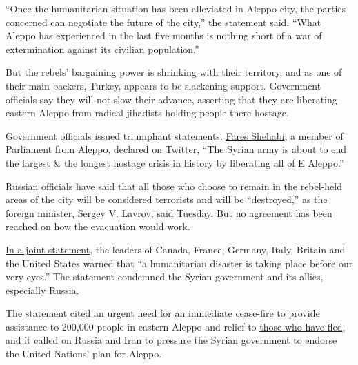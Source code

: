 ``Once the humanitarian situation has been alleviated in Aleppo city,
the parties concerned can negotiate the future of the city,'' the
statement said. ``What Aleppo has experienced in the last five months is
nothing short of a war of extermination against its civilian
population.''

But the rebels' bargaining power is shrinking with their territory, and
as one of their main backers, Turkey, appears to be slackening support.
Government officials say they will not slow their advance, asserting
that they are liberating eastern Aleppo from radical jihadists holding
people there hostage.

Government officials issued triumphant statements.
\href{https://twitter.com/ShehabiFares/status/806446029348503552}{Fares
Shehabi}, a member of Parliament from Aleppo, declared on Twitter, ``The
Syrian army is about to end the largest \& the longest hostage crisis in
history by liberating all of E Aleppo.''

Russian officials have said that all those who choose to remain in the
rebel-held areas of the city will be considered terrorists and will be
``destroyed,'' as the foreign minister, Sergey V. Lavrov,
\href{http://www.cbsnews.com/news/aleppo-fighting-continues-syrian-government-russia-warn-rebels-to-leave-city/}{said
Tuesday}. But no agreement has been reached on how the evacuation would
work.

\href{https://www.gov.uk/government/news/joint-statement-on-aleppo-7-december-2016}{In
a joint statement}, the leaders of Canada, France, Germany, Italy,
Britain and the United States warned that ``a humanitarian disaster is
taking place before our very eyes.'' The statement condemned the Syrian
government and its allies,
\href{http://www.nytimes3xbfgragh.onion/video/world/europe/100000004769407/russia-begins-new-offensive-in-aleppo.html?rref=collection\%2Ftimestopic\%2FSyria\&action=click\&contentCollection=world\&region=stream\&module=stream_unit\&version=latest\&contentPlacement=20\&pgtype=collection}{especially
Russia}.

The statement cited an urgent need for an immediate cease-fire to
provide assistance to 200,000 people in eastern Aleppo and relief to
\href{http://www.nytimes3xbfgragh.onion/video/world/middleeast/100000004799319/a-risky-flight-from-eastern-aleppo.html?rref=collection\%2Ftimestopic\%2FSyria\&action=click\&contentCollection=world\&region=stream\&module=stream_unit\&version=latest\&contentPlacement=6\&pgtype=collection}{those
who have fled}, and it called on Russia and Iran to pressure the Syrian
government to endorse the United Nations' plan for Aleppo.

